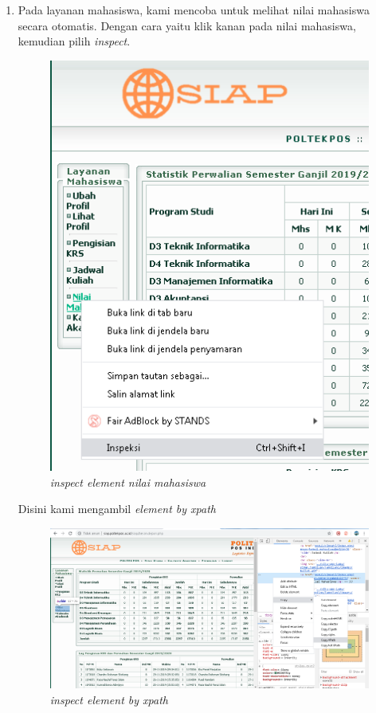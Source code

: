 \begin{enumerate}
\item Pada layanan mahasiswa, kami mencoba untuk melihat nilai mahasiswa secara otomatis. Dengan cara yaitu klik kanan pada nilai mahasiswa, kemudian pilih \textit{inspect}.
\begin{figure}[H]
    	\centering
    	\includegraphics[scale=0.5]{Figures/figures/nilai1.png}
    	\caption{\textit{inspect element nilai mahasiswa}}
    	\label{CLI}
	\end{figure}

\newpage

Disini kami mengambil \textit{element by xpath}
\begin{figure}[H]
    	\centering
    	\includegraphics[scale=0.3]{Figures/figures/nilai2.png}
    	\caption{\textit{inspect element by xpath}}
    	\label{CLI}
	\end{figure}
	

\end{enumerate}
